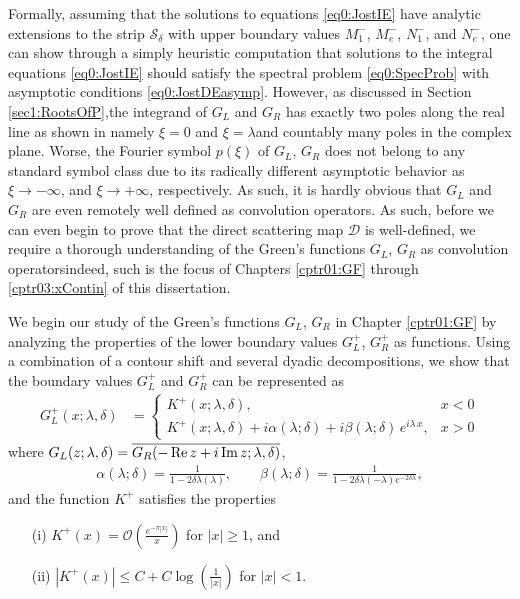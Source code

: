 \documentclass[../dissertation.tex]{subfiles}
\begin{document}
Formally, assuming that the solutions to equations \eqref{eq0:JostIE} 
have analytic extensions to the strip $\mathcal S_\delta$ with upper
boundary values
$M_1^-$, $M_e^-$, $N_1^-$, and $N_e^-$, one can show through a simply 
heuristic computation that solutions to the integral equations \eqref{eq0:JostIE} 
should satisfy the spectral problem \eqref{eq0:SpecProb} with asymptotic 
conditions \eqref{eq0:JostDEasymp}. However, as discussed in Section 
\ref{sec1:RootsOfP},the integrand of $G_L$ and $G_R$ has exactly two poles 
along the real line as shown in \textemdash{}namely $\xi = 0$ and 
$\xi = \lambda$\textemdash{}and countably many poles in the complex plane. 
Worse, the Fourier symbol $p(\xi)$ of $G_L$, $G_R$ does not belong to any
standard symbol class due to its radically different asymptotic behavior 
as $\xi \to -\infty$, and $\xi \to +\infty$, respectively. As such,
it is hardly obvious that $G_L$ and $G_R$ are even remotely well 
defined as convolution operators. As such, before we can even begin to prove 
that the direct scattering map $\mathscr D$ is well-defined, we require a 
thorough understanding of the Green's functions $G_L$, $G_R$ as convolution 
operators\textemdash{}indeed, such is the focus of Chapters \ref{cptr01:GF} 
through \ref{cptr03:xContin} of this dissertation.

We begin our study of the Green's functions $G_L$, $G_R$ in Chapter 
\ref{cptr01:GF} by analyzing the properties of the lower boundary 
values $G_L^+$, $G_R^+$ as functions.
Using a combination of a contour shift
and several dyadic decompositions, we show
that the boundary values $G_L^+$ and $G_R^+$ can be represented as 
\begin{align}\label{eq0:GFrep}
	G_L^+(x; \lambda, \delta)
		&= 
			\begin{cases}
				K^+(x; \lambda, \delta), &x < 0 \\
				K^+(x; \lambda, \delta)
				+ i \alpha(\lambda; \delta) 
				+ i \beta(\lambda; \delta) \, e^{i \lambda \, x}, 
				&x >0 
			\end{cases}
\end{align}
where $G_L(z; \lambda, \delta) = \overline{G_R(-\operatorname{Re} z +i\operatorname{Im} z; \lambda, \delta)}$, 
\begin{align*}
	\alpha(\lambda; \delta) 
		= \frac{1}{1-2\delta\lambda(\lambda)},
	\qquad
	\beta(\lambda; \delta) 
		= \frac{1}{1 - 2\delta\lambda(-\lambda) e^{-2\delta\lambda}},
\end{align*}
\label{sym0:residues}and the function $K^+$\label{sym0:K} satisfies the properties
\begin{itemize}
	\item[(i)] $K^+(x) = \mathcal O \left( \frac{e^{-\pi|x|}}{x} \right)$ 
		for $|x| \geq 1$, and
	\item[(ii)] $|K^+(x)| \leq C + C \log\left(\frac{1}{|x|}\right)$ for $|x| < 1$.
\end{itemize}
\end{document}
